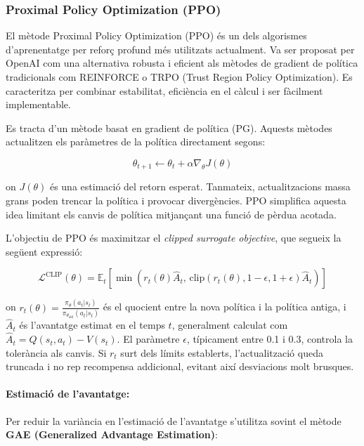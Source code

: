 \documentclass[12pt,a4paper,twoside]{book}
\begin{document}
\subsubsection{Proximal Policy Optimization (PPO)}

El mètode Proximal Policy Optimization (PPO) és un dels algorismes d'aprenentatge per reforç profund més utilitzats actualment. Va ser proposat per OpenAI com una alternativa robusta i eficient als mètodes de gradient de política tradicionals com REINFORCE o TRPO (Trust Region Policy Optimization)\cite{schulman2017}. Es caracteritza per combinar estabilitat, eficiència en el càlcul i ser fàcilment implementable.


Es tracta d'un mètode basat en gradient de política (PG). Aquests mètodes actualitzen els paràmetres de la política directament segons:

\begin{equation}
\theta_{t+1} \leftarrow \theta_t + \alpha \nabla_\theta J(\theta)
\end{equation}

on $J(\theta)$ és una estimació del retorn esperat. Tanmateix, actualitzacions massa grans poden trencar la política i provocar divergències. PPO simplifica aquesta idea limitant els canvis de política mitjançant una funció de pèrdua acotada.

L’objectiu de PPO és maximitzar el \textit{clipped surrogate objective}, que segueix la següent expressió:

\begin{equation}
\mathcal{L}^{\text{CLIP}}(\theta) = \mathbb{E}_t \left[ \min \left( r_t(\theta) \hat{A}_t, \, \text{clip}(r_t(\theta), 1 - \epsilon, 1 + \epsilon) \hat{A}_t \right) \right]
\end{equation}

on $r_t(\theta) = \frac{\pi_\theta(a_t | s_t)}{\pi_{\theta_{\text{old}}}(a_t | s_t)}$ és el quocient entre la nova política i la política antiga, i $\hat{A}_t$ és l’avantatge estimat en el temps $t$, generalment calculat com $\hat{A}_t = Q(s_t,a_t) - V(s_t)$. El paràmetre $\epsilon$, típicament entre 0.1 i 0.3, controla la tolerància als canvis. Si $r_t$ surt dels límits establerts, l’actualització queda truncada i no rep recompensa addicional, evitant així desviacions molt brusques.

\paragraph{Estimació de l'avantatge:}
Per reduir la variància en l'estimació de l'avantatge s'utilitza sovint el mètode \textbf{GAE (Generalized Advantage Estimation)}:
\end{document}
